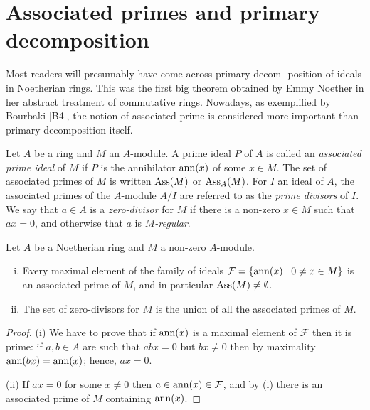 \section{Associated primes and primary decomposition}\label{sec:6}

Most readers will presumably have come across primary decom-
position of ideals in Noetherian rings. This was the first big theorem
obtained by Emmy Noether in her abstract treatment of commutative
rings. Nowadays, as exemplified by Bourbaki [B4], the notion of associated
prime is considered more important than primary decomposition itself.

Let $A$ be a ring and $M$ an $A$-module. A prime ideal $P$ of $A$ is called an
\emph{associated prime ideal} of $M$ if $P$ is the annihilator $\operatorname{ann}(x)$ of some $x \in M$. The
set of associated primes of $M$ is written $\operatorname{Ass}(M)$ or $\operatorname{Ass}_A(M)$. For $I$ an ideal
of $A$, the associated primes of the $A$-module $A/I$ are referred to as the
\emph{prime divisors} of $I$. We say that $a \in A$ is a \emph{zero-divisor} for $M$ if there is a non-zero
$x \in M$ such that $ax = 0$, and otherwise that $a$ is \emph{$M$-regular}.

\begin{theorem}\label{thm:6.1}
Let $A$ be a Noetherian ring and $M$ a non-zero $A$-module.
\begin{enumerate}[(i)]
  \item Every maximal element of the family of ideals $\mathcal{F} = \{\operatorname{ann}(x) \mid 0 \neq x \in M\}$
        is an associated prime of $M$, and in particular $\operatorname{Ass}(M) \neq \emptyset$.
  \item The set of zero-divisors for $M$ is the union of all the associated primes
        of $M$.
\end{enumerate}
\end{theorem}

\begin{proof}
(i) We have to prove that if $\operatorname{ann}(x)$ is a maximal element of $\mathcal{F}$ then it is
prime: if $a, b \in A$ are such that $abx = 0$ but $bx \neq 0$ then by maximality
$\operatorname{ann}(bx) = \operatorname{ann}(x)$; hence, $ax = 0$.

(ii) If $ax = 0$ for some $x \neq 0$ then $a \in \operatorname{ann}(x) \in \mathcal{F}$, and by (i) there is an
associated prime of $M$ containing $\operatorname{ann}(x)$.
\end{proof}

